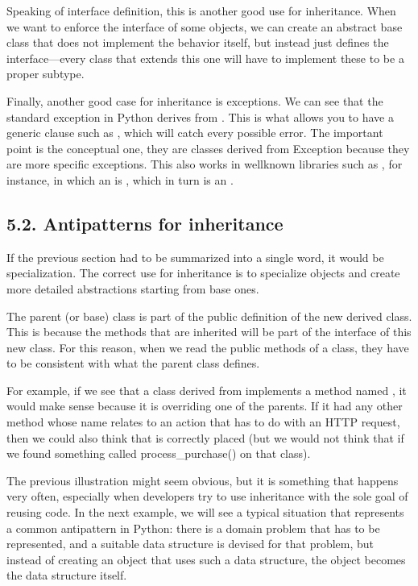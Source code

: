 \documentclass[a4paper,10pt,english]{sphinxmanual}
\begin{document}
Speaking of interface definition, this is another good use for inheritance. When we want to enforce the
interface of some objects, we can create an abstract base class that does not implement the behavior itself,
but instead just defines the interface—every class that extends this one will have to implement these to be a
proper subtype.

Finally, another good case for inheritance is exceptions. We can see that the standard exception in Python
derives from . This is what allows you to have a generic clause such as ,
which will catch every possible error. The important point is the conceptual one, they are classes derived
from Exception because they are more specific exceptions. This also works in well\sphinxhyphen{}known libraries such as
, for instance, in which an  is , which in turn is an .


\subsection{5.2. Anti\sphinxhyphen{}patterns for inheritance}
\label{\detokenize{chapters/3_general_traits/index:anti-patterns-for-inheritance}}
If the previous section had to be summarized into a single word, it would be specialization. The correct use
for inheritance is to specialize objects and create more detailed abstractions starting from base ones.

The parent (or base) class is part of the public definition of the new derived class. This is because the
methods that are inherited will be part of the interface of this new class. For this reason, when we read the
public methods of a class, they have to be consistent with what the parent class defines.

For example, if we see that a class derived from  implements a method named
, it would make sense because it is overriding one of the parents. If it had any other method
whose name relates to an action that has to do with an HTTP request, then we could also think that is
correctly placed (but we would not think that if we found something called process\_purchase() on that class).

The previous illustration might seem obvious, but it is something that happens very often, especially when
developers try to use inheritance with the sole goal of reusing code. In the next example, we will see a
typical situation that represents a common anti\sphinxhyphen{}pattern in Python: there is a domain problem that has to be
represented, and a suitable data structure is devised for that problem, but instead of creating an object that
uses such a data structure, the object becomes the data structure itself.
\end{document}
